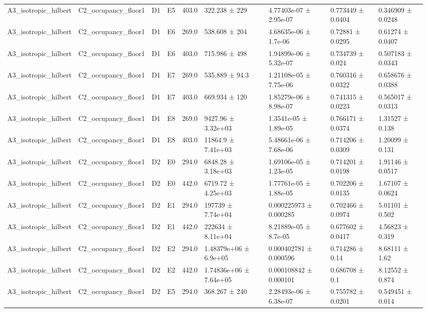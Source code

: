 \begin{table}
\begin{tabular}{lllllllll}
A3\_isotropic\_hilbert & C2\_occupancy\_floor1 & D1 & E5 & 403.0 & 322.238 ± 229 & 4.77403e-07 ± 2.95e-07 & 0.773449 ± 0.0404 & 0.346909 ± 0.0248 \\
A3\_isotropic\_hilbert & C2\_occupancy\_floor1 & D1 & E6 & 269.0 & 538.608 ± 204 & 4.68635e-06 ± 1.7e-06 & 0.72881 ± 0.0295 & 0.61274 ± 0.0407 \\
A3\_isotropic\_hilbert & C2\_occupancy\_floor1 & D1 & E6 & 403.0 & 715.986 ± 498 & 1.94899e-06 ± 5.32e-07 & 0.734739 ± 0.024 & 0.507183 ± 0.0343 \\
A3\_isotropic\_hilbert & C2\_occupancy\_floor1 & D1 & E7 & 269.0 & 535.889 ± 94.3 & 1.21108e-05 ± 7.75e-06 & 0.760316 ± 0.0322 & 0.658676 ± 0.0388 \\
A3\_isotropic\_hilbert & C2\_occupancy\_floor1 & D1 & E7 & 403.0 & 669.934 ± 120 & 1.85279e-06 ± 8.98e-07 & 0.741315 ± 0.0223 & 0.565017 ± 0.0313 \\
A3\_isotropic\_hilbert & C2\_occupancy\_floor1 & D1 & E8 & 269.0 & 9427.96 ± 3.32e+03 & 1.3541e-05 ± 1.89e-05 & 0.766171 ± 0.0374 & 1.31527 ± 0.138 \\
A3\_isotropic\_hilbert & C2\_occupancy\_floor1 & D1 & E8 & 403.0 & 11864.9 ± 7.41e+03 & 5.48661e-06 ± 7.68e-06 & 0.714206 ± 0.0309 & 1.20099 ± 0.131 \\
A3\_isotropic\_hilbert & C2\_occupancy\_floor1 & D2 & E0 & 294.0 & 6848.28 ± 3.18e+03 & 1.69106e-05 ± 1.23e-05 & 0.714201 ± 0.0198 & 1.91146 ± 0.0517 \\
A3\_isotropic\_hilbert & C2\_occupancy\_floor1 & D2 & E0 & 442.0 & 6719.72 ± 4.25e+03 & 1.77761e-05 ± 1.88e-05 & 0.702206 ± 0.0135 & 1.67107 ± 0.0624 \\
A3\_isotropic\_hilbert & C2\_occupancy\_floor1 & D2 & E1 & 294.0 & 197739 ± 7.74e+04 & 0.000225973 ± 0.000285 & 0.702466 ± 0.0974 & 5.01101 ± 0.502 \\
A3\_isotropic\_hilbert & C2\_occupancy\_floor1 & D2 & E1 & 442.0 & 222634 ± 8.11e+04 & 8.21889e-05 ± 8.7e-05 & 0.677602 ± 0.0417 & 4.56823 ± 0.319 \\
A3\_isotropic\_hilbert & C2\_occupancy\_floor1 & D2 & E2 & 294.0 & 1.48379e+06 ± 6.9e+05 & 0.000402781 ± 0.000596 & 0.714286 ± 0.14 & 8.68111 ± 1.62 \\
A3\_isotropic\_hilbert & C2\_occupancy\_floor1 & D2 & E2 & 442.0 & 1.74836e+06 ± 7.64e+05 & 0.000108842 ± 0.000101 & 0.686708 ± 0.1 & 8.12552 ± 0.874 \\
A3\_isotropic\_hilbert & C2\_occupancy\_floor1 & D2 & E5 & 294.0 & 368.267 ± 240 & 2.28493e-06 ± 6.38e-07 & 0.755782 ± 0.0201 & 0.549451 ± 0.014 \\

\end{tabular}
\end{table}
